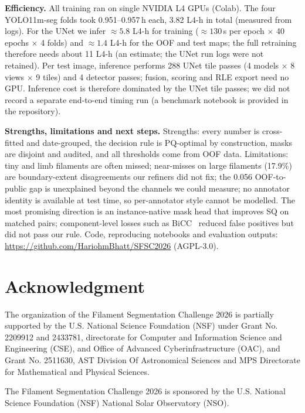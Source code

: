\documentclass[sigconf]{acmart}
\begin{document}
\textbf{Efficiency.} All training ran on single NVIDIA L4 GPUs (Colab). The four YOLO11m-seg folds took 0.951--0.957\,h each, 3.82 L4-h in total (measured from logs). For the UNet we infer ${\approx}5.8$ L4-h for training (${\approx}130$\,s per epoch $\times$ 40 epochs $\times$ 4 folds) and ${\approx}1.4$ L4-h for the OOF and test maps; the full retraining therefore needs about 11 L4-h (an estimate; the UNet run logs were not retained). Per test image, inference performs 288 UNet tile passes (4 models $\times$ 8 views $\times$ 9 tiles) and 4 detector passes; fusion, scoring and RLE export need no GPU. Inference cost is therefore dominated by the UNet tile passes; we did not record a separate end-to-end timing run (a benchmark notebook is provided in the repository).

\textbf{Strengths, limitations and next steps.} Strengths: every number is cross-fitted and date-grouped, the decision rule is PQ-optimal by construction, masks are disjoint and audited, and all thresholds come from OOF data. Limitations: tiny and limb filaments are often missed; near-misses on large filaments (17.9\%) are boundary-extent disagreements our refiners did not fix; the 0.056 OOF-to-public gap is unexplained beyond the channels we could measure; no annotator identity is available at test time, so per-annotator style cannot be modelled. The most promising direction is an instance-native mask head that improves SQ on matched pairs; component-level losses such as BiCC~\cite{bouteille2026bicc} reduced false positives but did not pass our rule. Code, reproducing notebooks and evaluation outputs: \url{https://github.com/HariohmBhatt/SFSC2026} (AGPL-3.0).

\section{Acknowledgment}\label{sec:acknowledgment}
    The organization of the Filament Segmentation Challenge 2026 is partially supported by the U.S. National Science Foundation (NSF) under Grant No. 2209912 and 2433781, directorate for Computer and Information Science and Engineering (CSE), and Office of Advanced Cyberinfrastructure (OAC), and Grant No. 2511630, AST Division Of Astronomical Sciences and MPS Directorate for Mathematical and Physical Sciences.

    The Filament Segmentation Challenge 2026 is sponsored by the U.S. National Science Foundation (NSF) National Solar Observatory (NSO).
\end{document}

